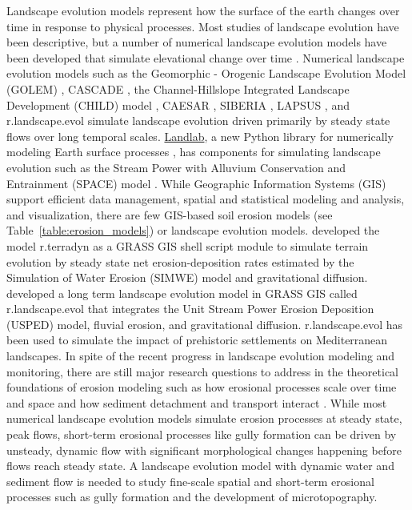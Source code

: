 \documentclass[gmd, manuscript]{copernicus}
\begin{document}
\introduction
Landscape evolution models represent how the surface of the earth changes 
over time in response to physical processes. 
Most studies of landscape evolution have been descriptive, 
but a number of numerical landscape evolution models 
have been developed that simulate elevational change over time 
\citep{Tucker2010,Temme2013}. 
Numerical landscape evolution models such as the 
Geomorphic - Orogenic Landscape Evolution Model (GOLEM) 
\citep{Tucker1994},
CASCADE \citep{Braun1997},
the Channel-Hillslope Integrated Landscape Development (CHILD) model 
\citep{Tucker2001},
CAESAR \citep{Coulthard2002,Coulthard2012},
SIBERIA \citep{Willgoose2005},
LAPSUS \citep{Schoorl2000,Schoorl2002},
and r.landscape.evol \citep{Barton2010}
simulate landscape evolution driven primarily by steady state flows over long temporal scales.
\href{http://landlab.github.io/}{Landlab},
a new Python library for numerically modeling Earth surface processes
\citep{Hobley2017},
has components for simulating landscape evolution such as the 
Stream Power with Alluvium Conservation and Entrainment (SPACE) 
model \citep{Shobe2017}.
While Geographic Information Systems (GIS)
support efficient data management, 
spatial and statistical modeling and analysis, 
and visualization,
there are few GIS-based soil erosion models (see Table~\ref{table:erosion_models})
or landscape evolution models.
\citet{Thaxton2004} developed the model r.terradyn 
as a GRASS GIS shell script module 
to simulate terrain evolution 
by steady state net erosion-deposition rates
estimated by the Simulation of Water Erosion (SIMWE) model \citep{Mitas1998}
and gravitational diffusion. 
\citet{Barton2010} developed a long term landscape evolution model
in GRASS GIS called r.landscape.evol that integrates 
the Unit Stream Power Erosion Deposition (USPED) model,
fluvial erosion, and gravitational diffusion.
r.landscape.evol has been used to simulate the impact 
of prehistoric settlements on Mediterranean landscapes.
In spite of the recent progress in landscape evolution modeling and monitoring, 
there are still major research questions 
to address in the theoretical foundations of erosion modeling 
such as how erosional processes scale over time and space 
and how sediment detachment and transport interact \citep{Mitasova2013}. 
While most numerical landscape evolution models 
simulate erosion processes at steady state, peak flows,
short-term erosional processes like gully formation 
can be driven by unsteady, dynamic flow
with significant morphological changes happening before flows reach steady state. 
A landscape evolution model with dynamic water and sediment flow
is needed to study fine-scale spatial 
and short-term erosional processes
such as gully formation and the development of microtopography. 
\end{document}

